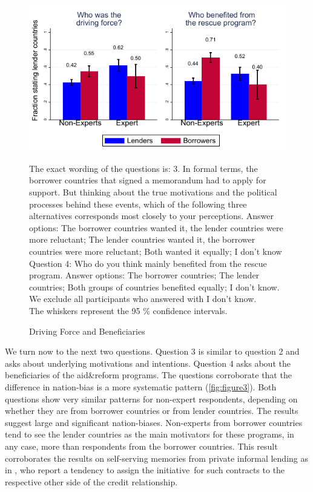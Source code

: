 \begin{figure}
    \begin{center}
      \caption{Driving Force and Beneficiaries}
    \includegraphics[scale=1.2]{graph3.pdf}
  
    \label{fig:figure2}
    \end{center}
    \tiny
    \begin{tablenotes} 
    {The exact wording of the questions is: 3. In formal terms, the borrower countries that signed a memorandum had to apply for support. But thinking about the true motivations and the political processes behind these events, which of the following three alternatives corresponds most closely to your perceptions. Answer options: The borrower countries wanted it, the lender countries were more reluctant; The lender countries wanted it, the borrower countries were more reluctant; Both wanted it equally; I don't know \\
   Question 4: Who do you think mainly benefited from the rescue program. Answer options: The borrower countries; The lender countries; Both groups of countries benefited equally; I don't know. We exclude all participants who answered with I don't know. \\
   The whiskers represent the 95 \% confidence intervals.}  
    \end{tablenotes}
\end{figure}
We
turn now to the next two questions.
Question 3 is similar to question 2 and asks about underlying motivations
and intentions. Question 4 asks about the beneficiaries of the aid\&reform
programs. The questions corroborate that the difference in nation-bias is a more systematic pattern (\autoref{fig:figure3}). Both questions show very similar patterns for non-expert
respondents, depending on whether they are from borrower countries or from
lender countries. The results suggest large and significant nation-biases. Non-experts
from borrower countries tend to see the lender countries as the main
motivators for these programs, in any case, more than respondents from the
borrower countries. This result corroborates the results on
self-serving memories from private informal lending as in \cite{dezso}, who report a tendency to assign the initiative\
for such contracts to the respective other side of the credit relationship. 


